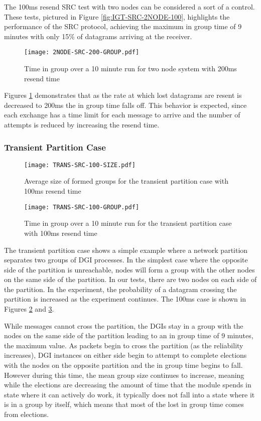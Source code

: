 The 100ms resend SRC test with two nodes can be considered a sort of a control.
These tests, pictured in Figure \ref{fig:IGT-SRC-2NODE-100}, highlights the performance of the
SRC protocol, achieving the maximum in group time of 9 minutes with only 15\%
of datagrams arriving at the receiver. 

\begin{figure}[!h]
\centering
\texttt{[image: 2NODE-SRC-200-GROUP.pdf]}
\caption{Time in group over a 10 minute run for two node system with 200ms resend time}
\label{fig:IGT-SRC-2NODE-200}
\end{figure}

Figures \ref{fig:IGT-SRC-2NODE-200} demonstrates that as the
rate at which lost datagrams are resent is decreased to 200ms the
in group time falls off. This behavior is expected, since each exchange has a
time limit for each message to arrive and the number of attempts is reduced by
increasing the resend time.


\subsubsection{Transient Partition Case}

\begin{figure}[!h]
\centering
\texttt{[image: TRANS-SRC-100-SIZE.pdf]}
\caption{Average size of formed groups for the transient partition case with 100ms resend time}
\label{fig:MGS-SRC-TRANS-100}
\end{figure}

\begin{figure}[!h]
\centering
\texttt{[image: TRANS-SRC-100-GROUP.pdf]}
\caption{Time in group over a 10 minute run for the transient partition case with 100ms resend time}
\label{fig:IGT-SRC-TRANS-100}
\end{figure}

The transient partition case shows a simple example where a network partition
separates two groups of DGI processes. In the simplest case where the opposite side of
the partition is unreachable, nodes will form a group with the other nodes on the
same side of the partition. In our tests, there are two nodes on each side of
the partition. In the experiment, the probability of a datagram crossing the
partition is increased as the experiment continues. The 100ms case is shown in
Figures \ref{fig:MGS-SRC-TRANS-100} and \ref{fig:IGT-SRC-TRANS-100}.

While messages cannot cross the partition, the DGIs stay in a group with the
nodes on the same side of the partition leading to an in group time of 9 minutes,
the maximum value. As packets begin to cross the partition (as the reliability
increases), DGI instances on either side begin to attempt to complete elections
with the nodes on the opposite partition and the in group time begins to fall.
However during this time, the mean group size continues to increase, meaning
while the elections are decreasing the amount of time that the module spends in
state where it can actively do work, it typically does not fall into a state
where it is in a group by itself, which means that most of the lost in group
time comes from elections.

